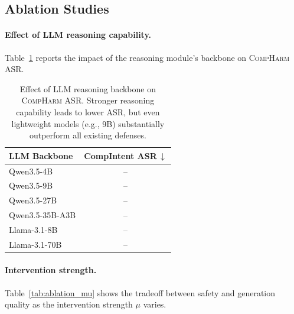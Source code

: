 \documentclass{article}
\begin{document}
\subsection{Ablation Studies}
\label{sec:exp_ablation}

\paragraph{Effect of LLM reasoning capability.}
Table~\ref{tab:ablation_llm} reports the impact of the reasoning module's backbone on \textsc{CompHarm} ASR.

\begin{table}[h]
\centering
\footnotesize
\begin{tabular}{@{} l c @{}}
\toprule
\textbf{LLM Backbone} & \textbf{CompIntent ASR\,$\downarrow$} \\
\midrule
Qwen3.5-4B        & --   \\
Qwen3.5-9B        & --   \\
Qwen3.5-27B       & --   \\
Qwen3.5-35B-A3B   & --   \\
Llama-3.1-8B      & --   \\
Llama-3.1-70B     & --   \\
\bottomrule
\end{tabular}
\caption{Effect of LLM reasoning backbone on \textsc{CompHarm} ASR. Stronger reasoning capability leads to lower ASR, but even lightweight models (e.g., 9B) substantially outperform all existing defenses.}
\label{tab:ablation_llm}
\end{table}

\paragraph{Intervention strength.}
Table~\ref{tab:ablation_mu} shows the tradeoff between safety and generation quality as the intervention strength $\mu$ varies.
\end{document}
